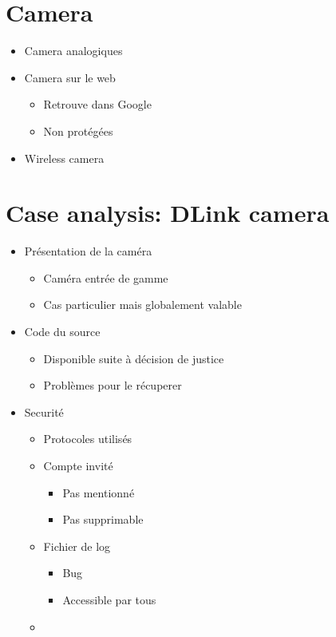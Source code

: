 
\chapter{Camera}

\begin{itemize}
\item Camera analogiques
\item Camera sur le web
  \begin{itemize}
  \item Retrouve dans Google
  \item Non protégées
  \end{itemize}
\item Wireless camera
\end{itemize}

\chapter{Case analysis: DLink camera}

\begin{itemize}
\item Présentation de la caméra
  \begin{itemize}
  \item Caméra entrée de gamme
  \item Cas particulier mais globalement valable
  \end{itemize}
\item Code du source
  \begin{itemize}
  \item Disponible suite à décision de justice
  \item Problèmes pour le récuperer
  \end{itemize}
\item Securité
  \begin{itemize}
  \item Protocoles utilisés
  \item Compte invité
    \begin{itemize}
    \item Pas mentionné
    \item Pas supprimable
    \end{itemize}
  \item Fichier de log
    \begin{itemize}
    \item Bug
    \item Accessible par tous
    \end{itemize}
  \item 
  \end{itemize}
\end{itemize}